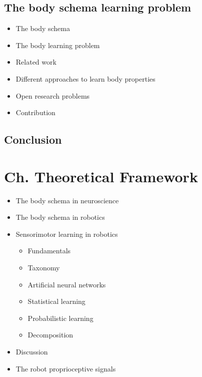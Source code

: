\documentclass[12pt, a4paper]{article}
\begin{document}
\subsection*{The body schema learning problem}
\begin{itemize}
	\item The body schema
	\item The body learning problem
	\item Related work
	\item Different approaches to learn body properties
	\item Open research problems
	\item Contribution
\end{itemize}

\subsection*{Conclusion}

\section*{Ch. Theoretical Framework}

\begin{itemize}
	\item The body schema in neuroscience
	\item The body schema in robotics
	\item Sensorimotor learning in robotics
	\begin{itemize}
		\item Fundamentals
		\item Taxonomy
		\item[] Artificial neural networks
		\item Statistical learning
		\item[] Probabilistic learning
		\item Decomposition
	\end{itemize}
	\item Discussion
	\item The robot proprioceptive signals
\end{itemize}
\end{document}

